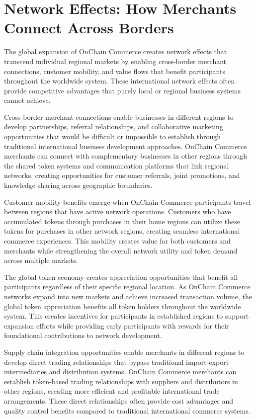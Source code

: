 \documentclass[
  Letterpaper,
]{scrbook}
\begin{document}
\section{Network Effects: How Merchants Connect Across
Borders}\label{network-effects-how-merchants-connect-across-borders}

The global expansion of OnChain Commerce creates network effects that
transcend individual regional markets by enabling cross-border merchant
connections, customer mobility, and value flows that benefit
participants throughout the worldwide system. These international
network effects often provide competitive advantages that purely local
or regional business systems cannot achieve.

Cross-border merchant connections enable businesses in different regions
to develop partnerships, referral relationships, and collaborative
marketing opportunities that would be difficult or impossible to
establish through traditional international business development
approaches. OnChain Commerce merchants can connect with complementary
businesses in other regions through the shared token systems and
communication platforms that link regional networks, creating
opportunities for customer referrals, joint promotions, and knowledge
sharing across geographic boundaries.

Customer mobility benefits emerge when OnChain Commerce participants
travel between regions that have active network operations. Customers
who have accumulated tokens through purchases in their home regions can
utilize these tokens for purchases in other network regions, creating
seamless international commerce experiences. This mobility creates value
for both customers and merchants while strengthening the overall network
utility and token demand across multiple markets.

The global token economy creates appreciation opportunities that benefit
all participants regardless of their specific regional location. As
OnChain Commerce networks expand into new markets and achieve increased
transaction volume, the global token appreciation benefits all token
holders throughout the worldwide system. This creates incentives for
participants in established regions to support expansion efforts while
providing early participants with rewards for their foundational
contributions to network development.

Supply chain integration opportunities enable merchants in different
regions to develop direct trading relationships that bypass traditional
import-export intermediaries and distribution systems. OnChain Commerce
merchants can establish token-based trading relationships with suppliers
and distributors in other regions, creating more efficient and
profitable international trade arrangements. These direct relationships
often provide cost advantages and quality control benefits compared to
traditional international commerce systems.
\end{document}
